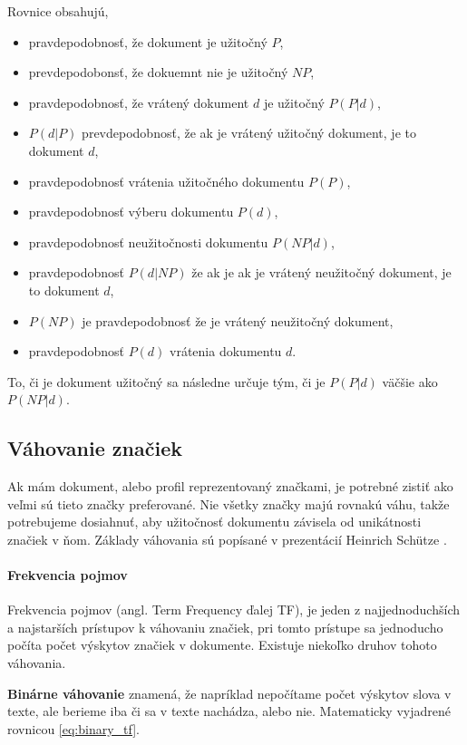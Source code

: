 Rovnice obsahujú,
\begin{itemize}
\item{pravdepodobnosť, že dokument je užitočný \(P\),}
\item{prevdepodobonsť, že dokuemnt nie je užitočný \(NP\),}
\item{pravdepodobnosť, že vrátený dokument \(d\) je užitočný \(P(P|d)\),}
\item{\(P(d|P)\) prevdepodobnosť, že ak je vrátený užitočný dokument, je to dokument \(d\),}
\item{pravdepodobnosť vrátenia užitočného dokumentu \(P(P)\),}
\item{pravdepodobnosť výberu dokumentu \(P(d)\),}
\item{pravdepodobnosť neužitočnosti dokumentu \(P(NP|d)\),}
\item{pravdepodobnosť \(P(d|NP)\) že ak je ak je vrátený neužitočný dokument,
    je to dokument \(d\),}
\item{\(P(NP)\) je pravdepodobnosť že je vrátený neužitočný dokument,}
\item{pravdepodobnosť \(P(d)\) vrátenia dokumentu \(d\).}
\end{itemize}

To, či je dokument užitočný sa následne určuje tým, či je \(P(P|d)\) väčšie ako \(P(NP|d)\).

\subsection{Váhovanie značiek}

Ak mám dokument, alebo profil reprezentovaný značkami, je potrebné zistiť ako veľmi sú tieto 
značky preferované. Nie všetky značky majú rovnakú váhu, takže potrebujeme dosiahnuť, 
aby užitočnosť dokumentu závisela od unikátnosti značiek v ňom. Základy váhovania sú popísané 
v prezentácií Heinrich Schütze \cite{vector_space_model}.

\paragraph{Frekvencia pojmov}

Frekvencia pojmov (angl. Term Frequency ďalej TF),
je jeden z najjednoduchších a najstarších prístupov k váhovaniu značiek,
pri tomto prístupe sa jednoducho počíta počet výskytov značiek v dokumente.
Existuje niekoľko druhov tohoto váhovania.

\textbf{Binárne váhovanie} znamená, že napríklad nepočítame počet výskytov
slova v texte, ale berieme iba či sa v texte nachádza, alebo nie. Matematicky
vyjadrené rovnicou \ref{eq:binary_tf}.

